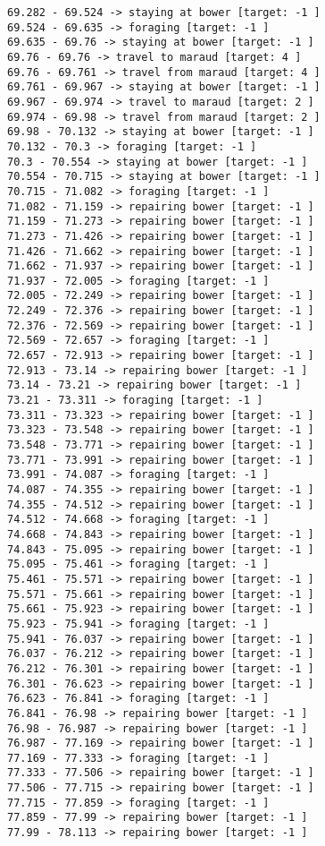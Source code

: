 \documentclass[11pt]{article}
\begin{document}
\begin{Verbatim}[commandchars=\\\{\}]
69.282 - 69.524 -> staying at bower [target: -1 ]
69.524 - 69.635 -> foraging [target: -1 ]
69.635 - 69.76 -> staying at bower [target: -1 ]
69.76 - 69.76 -> travel to maraud [target: 4 ]
69.76 - 69.761 -> travel from maraud [target: 4 ]
69.761 - 69.967 -> staying at bower [target: -1 ]
69.967 - 69.974 -> travel to maraud [target: 2 ]
69.974 - 69.98 -> travel from maraud [target: 2 ]
69.98 - 70.132 -> staying at bower [target: -1 ]
70.132 - 70.3 -> foraging [target: -1 ]
70.3 - 70.554 -> staying at bower [target: -1 ]
70.554 - 70.715 -> staying at bower [target: -1 ]
70.715 - 71.082 -> foraging [target: -1 ]
71.082 - 71.159 -> repairing bower [target: -1 ]
71.159 - 71.273 -> repairing bower [target: -1 ]
71.273 - 71.426 -> repairing bower [target: -1 ]
71.426 - 71.662 -> repairing bower [target: -1 ]
71.662 - 71.937 -> repairing bower [target: -1 ]
71.937 - 72.005 -> foraging [target: -1 ]
72.005 - 72.249 -> repairing bower [target: -1 ]
72.249 - 72.376 -> repairing bower [target: -1 ]
72.376 - 72.569 -> repairing bower [target: -1 ]
72.569 - 72.657 -> foraging [target: -1 ]
72.657 - 72.913 -> repairing bower [target: -1 ]
72.913 - 73.14 -> repairing bower [target: -1 ]
73.14 - 73.21 -> repairing bower [target: -1 ]
73.21 - 73.311 -> foraging [target: -1 ]
73.311 - 73.323 -> repairing bower [target: -1 ]
73.323 - 73.548 -> repairing bower [target: -1 ]
73.548 - 73.771 -> repairing bower [target: -1 ]
73.771 - 73.991 -> repairing bower [target: -1 ]
73.991 - 74.087 -> foraging [target: -1 ]
74.087 - 74.355 -> repairing bower [target: -1 ]
74.355 - 74.512 -> repairing bower [target: -1 ]
74.512 - 74.668 -> foraging [target: -1 ]
74.668 - 74.843 -> repairing bower [target: -1 ]
74.843 - 75.095 -> repairing bower [target: -1 ]
75.095 - 75.461 -> foraging [target: -1 ]
75.461 - 75.571 -> repairing bower [target: -1 ]
75.571 - 75.661 -> repairing bower [target: -1 ]
75.661 - 75.923 -> repairing bower [target: -1 ]
75.923 - 75.941 -> foraging [target: -1 ]
75.941 - 76.037 -> repairing bower [target: -1 ]
76.037 - 76.212 -> repairing bower [target: -1 ]
76.212 - 76.301 -> repairing bower [target: -1 ]
76.301 - 76.623 -> repairing bower [target: -1 ]
76.623 - 76.841 -> foraging [target: -1 ]
76.841 - 76.98 -> repairing bower [target: -1 ]
76.98 - 76.987 -> repairing bower [target: -1 ]
76.987 - 77.169 -> repairing bower [target: -1 ]
77.169 - 77.333 -> foraging [target: -1 ]
77.333 - 77.506 -> repairing bower [target: -1 ]
77.506 - 77.715 -> repairing bower [target: -1 ]
77.715 - 77.859 -> foraging [target: -1 ]
77.859 - 77.99 -> repairing bower [target: -1 ]
77.99 - 78.113 -> repairing bower [target: -1 ]

\end{Verbatim}
\end{document}

